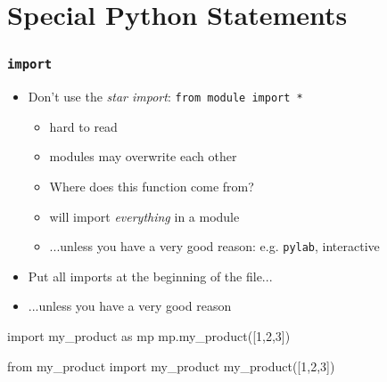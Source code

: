 \documentclass{beamer}
\begin{document}

\section{Special Python Statements}


\begin{frame}[containsverbatim]
\frametitle{\texttt{import}}
  
\begin{itemize}
  \item Don't use the \emph{star import}: \texttt{from module import *}
\begin{itemize}
  \item hard to read
  \item modules may overwrite each other
  \item Where does this function come from?
  \item will import \emph{everything} in a module
  \item ...unless you have a very good reason: e.g. \texttt{pylab}, interactive
\end{itemize}
\end{itemize}

\begin{itemize}
  \item Put all imports at the beginning of the file...
  \item ...unless you have a very good reason
\end{itemize}

\begin{example}
\begin{pycode}
import my_product as mp
mp.my_product([1,2,3])
\end{pycode}

\begin{pycode}
from my_product import my_product
my_product([1,2,3])
\end{pycode}
\end{example}

\end{frame}

\end{document}
